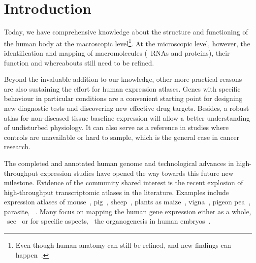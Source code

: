 \chapter*{Introduction}\label{ch:intro}

\setlength{\epigraphwidth}{0.62\textwidth}
\setlength{\epigraphrule}{0pt}

\vspace{-4mm}

Today, we have comprehensive knowledge %
about the structure and functioning of the human body
at the macroscopic level\footnote{%
Even though human anatomy can still be refined,
and new findings can happen~.}.
At the microscopic level, however,
the identification and mapping of macromolecules
(\ie\ \glspl{RNA} and proteins),
their function and whereabouts still need to be refined.

Beyond the invaluable addition to our knowledge,
other more practical reasons are also sustaining the effort
for human expression atlases.
Genes with specific behaviour in particular conditions
are a convenient starting point
for designing new diagnostic tests
and discovering new effective drug targets.
Besides, a robust atlas for non-diseased tissue baseline expression
will allow a better understanding of undisturbed physiology.
It can also serve as a reference in studies where controls are unavailable
or hard to sample,
which is the general case in cancer research.

The completed and annotated human genome and
technological advances in high-throughput expression studies
have opened the way towards this future new milestone.
Evidence of the community shared interest is
the recent explosion of high-throughput transcriptomic atlases in the literature.
Examples include expression atlases of
mouse~, pig~,
sheep~, plants as maize~,
vigna~, pigeon pea~,
parasite, \eg\ .
Many focus on mapping the human gene expression either as a whole,
\eg\ see~
or for specific aspects,
\eg\ the organogenesis in human embryos~.

